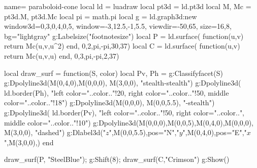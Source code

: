 \documentclass[border=5pt]{standalone}%
\begin{document}
\begin{luadraw}{name= paraboloid-cone}
local ld = luadraw
local pt3d = ld.pt3d
local M, Mc = pt3d.M, pt3d.Mc
local pi = math.pi
local g = ld.graph3d:new{ window3d={0,3,0,4,0,5}, window={-3,12.5,-1,5.5}, 
    viewdir={-50,65}, size={16,8}, bg="lightgray"}
g:Labelsize("footnotesize")
local P = ld.surface( function(u,v) return Mc(u,v,u^2) end, 0,2,pi,-pi,{30,37})
local C = ld.surface( function(u,v) return Mc(u,v,u) end, 0,3,pi,-pi,{2,37})

local draw_surf = function(S, color)
    local Pv, Ph = g:Classifyfacet(S)
    g:Dpolyline3d({M(0,4,0),M(0,0,0), M(3,0,0)}, "stealth-stealth")
    g:Dpolyline3d( ld.border(Ph), 
        "left color="..color.."!20, right color="..color.."!50, middle color="..color.."!18")
    g:Dpolyline3d({M(0,0,0), M(0,0,5.5)}, "-stealth")
    g:Dpolyline3d( ld.border(Pv), 
        "left color="..color.."!50, right color="..color..", middle color="..color.."!10")
    g:Dpolyline3d({{M(0,0,0),M(0,0,5)},{M(0,4,0),M(0,0,0), M(3,0,0)}}, "dashed")
    g:Dlabel3d("$z$",M(0,0,5.5),{pos="N"},"$y$",M(0,4,0),{pos="E"},"$x$",M(3,0,0),{})
end

draw_surf(P, "SteelBlue"); g:Shift(8); draw_surf(C,"Crimson")
g:Show() 
\end{luadraw}
\end{document}
